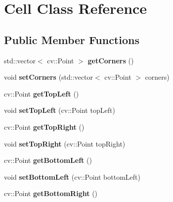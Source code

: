 \hypertarget{class_cell}{}\section{Cell Class Reference}
\label{class_cell}
\subsection*{Public Member Functions}
\begin{DoxyCompactItemize}
\item 
\mbox{\label{class_cell_a03becce6b307d86848e9563eb08ac2b3}} 
std\+::vector$<$ cv\+::\+Point $>$ {\bfseries get\+Corners} ()
\item 
\mbox{\label{class_cell_a6d1ad0f2766cdd641ba0e65f8b3c9555}} 
void {\bfseries set\+Corners} (std\+::vector$<$ cv\+::\+Point $>$ corners)
\item 
\mbox{\label{class_cell_ac6e9338748b2098e034641c88a977b23}} 
cv\+::\+Point {\bfseries get\+Top\+Left} ()
\item 
\mbox{\label{class_cell_a9e2d13652a170ef25265a41dfe39e93f}} 
void {\bfseries set\+Top\+Left} (cv\+::\+Point top\+Left)
\item 
\mbox{\label{class_cell_a4b08bffc22a4393fd86c9608d9723d7c}} 
cv\+::\+Point {\bfseries get\+Top\+Right} ()
\item 
\mbox{\label{class_cell_a245afe36e263e2fbf66880e4ea628f40}} 
void {\bfseries set\+Top\+Right} (cv\+::\+Point top\+Right)
\item 
\mbox{\label{class_cell_a1946142c5e112176e1cd20cc6d07f831}} 
cv\+::\+Point {\bfseries get\+Bottom\+Left} ()
\item 
\mbox{\label{class_cell_a86387a50a4c3f641eede253ce6cfcddb}} 
void {\bfseries set\+Bottom\+Left} (cv\+::\+Point bottom\+Left)
\item 
\mbox{\label{class_cell_afa1704102095fd55ac036f7d290eed05}} 
cv\+::\+Point {\bfseries get\+Bottom\+Right} ()
\item 
\mbox{\label{class_cell_ae68ff90cfde34cec208e8e74ce3f2745}} 

\end{DoxyCompactItemize}
